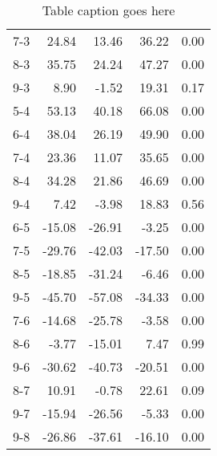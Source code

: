 \documentclass[10pt,a4paper]{article}
\begin{document}
\begin{table}[ht]
\begin{tabular}{rrrrr}
  7-3 & 24.84 & 13.46 & 36.22 & 0.00 \\ 
  8-3 & 35.75 & 24.24 & 47.27 & 0.00 \\ 
  9-3 & 8.90 & -1.52 & 19.31 & 0.17 \\ 
  5-4 & 53.13 & 40.18 & 66.08 & 0.00 \\ 
  6-4 & 38.04 & 26.19 & 49.90 & 0.00 \\ 
  7-4 & 23.36 & 11.07 & 35.65 & 0.00 \\ 
  8-4 & 34.28 & 21.86 & 46.69 & 0.00 \\ 
  9-4 & 7.42 & -3.98 & 18.83 & 0.56 \\ 
  6-5 & -15.08 & -26.91 & -3.25 & 0.00 \\ 
  7-5 & -29.76 & -42.03 & -17.50 & 0.00 \\ 
  8-5 & -18.85 & -31.24 & -6.46 & 0.00 \\ 
  9-5 & -45.70 & -57.08 & -34.33 & 0.00 \\ 
  7-6 & -14.68 & -25.78 & -3.58 & 0.00 \\ 
  8-6 & -3.77 & -15.01 & 7.47 & 0.99 \\ 
  9-6 & -30.62 & -40.73 & -20.51 & 0.00 \\ 
  8-7 & 10.91 & -0.78 & 22.61 & 0.09 \\ 
  9-7 & -15.94 & -26.56 & -5.33 & 0.00 \\ 
  9-8 & -26.86 & -37.61 & -16.10 & 0.00 \\ 
   \hline
\end{tabular}
\caption{Table caption goes here}
\label{table:5}
\end{table}
\end{document}
